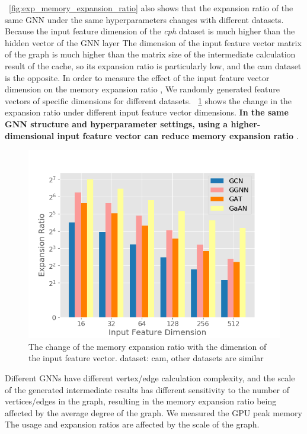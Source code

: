 \figurename~\ref{fig:exp_memory_expansion_ratio} also shows that the expansion ratio of the same GNN under the same hyperparameters changes with different datasets.
Because the input feature dimension of the \textit{cph} dataset is much higher than the hidden vector of the GNN layer The dimension of the input feature vector matrix
of the graph is much higher than the matrix size of the intermediate calculation result of the cache, 
so its expansion ratio is particularly low, and the cam dataset is the opposite. In order to measure the effect of the input feature vector dimension on the memory
expansion ratio , We randomly generated feature vectors of specific dimensions for different datasets.
\figurename~\ref{fig:exp_memory_expension_ratio_input_feature_dimension} shows the change in the expansion ratio under different input feature vector dimensions.
\textbf{In the same GNN structure and hyperparameter settings, using a higher-dimensional input feature vector can reduce memory expansion ratio} .

\begin{figure}
    \centering
    \includegraphics[width=0.7\columnwidth]{figs/experiments/exp_memory_expansion_ratio_input_feature_dimension_com-amazon.png}
    \caption{The change of the memory expansion ratio with the dimension of the input feature vector. dataset: cam, other datasets are similar}
    \label{fig:exp_memory_expension_ratio_input_feature_dimension}
\end{figure}

Different GNNs have different vertex/edge calculation complexity, and the scale of the generated intermediate results has different sensitivity
to the number of vertices/edges in the graph, resulting in the memory expansion ratio being affected by the average degree of the graph.
We measured the GPU peak memory The usage and expansion ratios are affected by the scale of the graph.

